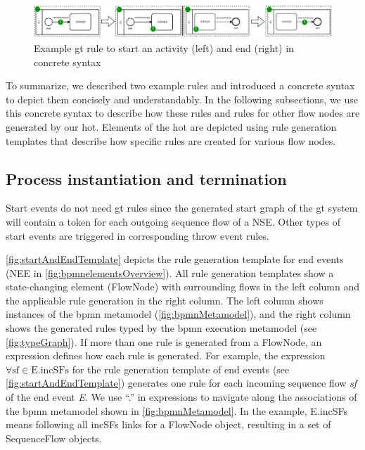 \documentclass[runningheads]{llncs}
\begin{document}
\begin{figure}[ht]
    \centering
  \includegraphics[width=1\textwidth]{images/rule_concrete.pdf}
  \caption{Example \gls*{gt} rule to start an activity (left) and end (right) in concrete syntax}
  \label{fig:gtRuleConcrete}
\end{figure}

To summarize, we described two example rules and introduced a concrete syntax to depict them concisely and understandably.
In the following subsections, we use this concrete syntax to describe how these rules and rules for other flow nodes are generated by our \gls*{hot}.
Elements of the \gls*{hot} are depicted using rule generation templates that describe how specific rules are created for various flow nodes.

\subsection{Process instantiation and termination} \label{subsec:instAndTermination}

Start events do not need \gls*{gt} rules since the generated start graph of the \gls*{gt} system will contain a token for each outgoing sequence flow of a NSE.
Other types of start events are triggered in corresponding throw event rules.

\autoref{fig:startAndEndTemplate} depicts the rule generation template for end events (\textsf{NEE} in \autoref{fig:bpmnelementsOverview}).
All rule generation templates show a state-changing element (\textsf{FlowNode}) with surrounding flows in the left column and the applicable rule generation in the right column.
The left column shows instances of the \gls*{bpmn} metamodel (\autoref{fig:bpmnMetamodel}), and the right column shows the generated rules typed by the \gls*{bpmn} execution metamodel (see \autoref{fig:typeGraph}).
If more than one rule is generated from a \textsf{FlowNode}, an expression defines how each rule is generated.
For example, the expression $\forall \text{sf} \in \text{E.incSFs}$ for the rule generation template of end events (see \autoref{fig:startAndEndTemplate}) generates one rule for each incoming sequence flow \textit{sf} of the end event \textit{E}.
We use ``.'' in expressions to navigate along the associations of the \gls*{bpmn} metamodel shown in \autoref{fig:bpmnMetamodel}.
In the example, \textsf{E.incSFs} means following all \textsf{incSFs} links for a \textsf{FlowNode} object, resulting in a set of \textsf{SequenceFlow} objects.
\end{document}
